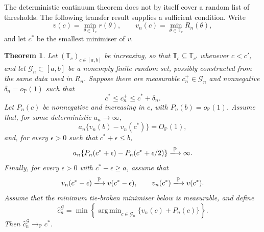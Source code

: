 \documentclass[12pt]{article}
\DeclareMathOperator*{\argmin}{arg\,min}
\newenvironment{bluechange}{\begingroup\color[rgb]{0.00,0.00,1.00}}{\endgroup}
\newtheorem{theorem}{Theorem}
\theoremstyle{remark}
\theoremstyle{plain}
\begin{document}
\begin{bluechange}
The deterministic continuum theorem does not by itself cover a random list of thresholds. The following transfer result supplies a sufficient condition. Write
\[
v(c)=\min_{\theta\in\mathbb T_c}r(\theta),\qquad
v_n(c)=\min_{\theta\in\mathbb T_c}R_n(\theta),
\]
and let $c^*$ be the smallest minimiser of $v$.

\begin{theorem}\label{Thm: random finite grid}
Let $(\mathbb T_c)_{c\in[a,b]}$ be increasing, so that $\mathbb T_c\subseteq\mathbb T_{c'}$ whenever $c<c'$, and let $\mathcal G_n\subset[a,b]$ be a nonempty finite random set, possibly constructed from the same data used in $R_n$. Suppose there are measurable $c_n^+\in\mathcal G_n$ and nonnegative $\delta_n=o_{\mathbb P}(1)$ such that
\begin{equation}\label{Eqs: one sided coverage}
c^*\le c_n^+\le c^*+\delta_n.
\end{equation}
Let $P_n(c)$ be nonnegative and increasing in $c$, with $P_n(b)=o_{\mathbb P}(1)$. Assume that, for some deterministic $a_n\to\infty$,
\begin{equation}\label{Eqs: random grid empirical gap}
a_n\{v_n(b)-v_n(c^*)\}=O_{\mathbb P}(1),
\end{equation}
and, for every $\epsilon>0$ such that $c^*+\epsilon\le b$,
\begin{equation}\label{Eqs: random grid penalty separation}
a_n\{P_n(c^*+\epsilon)-P_n(c^*+\epsilon/2)\}
\xlongrightarrow{\mathbb P}\infty.
\end{equation}
Finally, for every $\epsilon>0$ with $c^*-\epsilon\ge a$, assume that
\begin{equation}\label{Eqs: random grid pointwise convergence}
v_n(c^*-\epsilon)\xlongrightarrow{\mathbb P}v(c^*-\epsilon),
\qquad
v_n(c^*)\xlongrightarrow{\mathbb P}v(c^*).
\end{equation}
Assume that the minimum tie-broken minimiser below is measurable, and define
\[
\widehat c_n^{\mathcal G}
=\min\left\{\argmin_{c\in\mathcal G_n}\{v_n(c)+P_n(c)\}\right\}.
\]
Then $\widehat c_n^{\mathcal G}\to_{\mathbb P}c^*$.
\end{theorem}


\end{bluechange}
\end{document}
